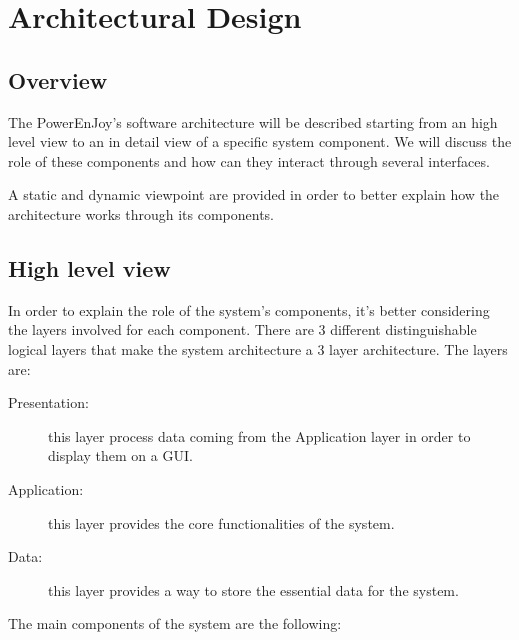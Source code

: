 \section{Architectural Design} \label{sec architectural design}

\subsection{Overview}

The PowerEnJoy's software architecture will be described starting from an high level view to an in detail view of a specific system component. We will discuss the role of these components and how can they interact through several interfaces.

A static and dynamic viewpoint are provided in order to better explain how the architecture works through its components.

\subsection{High level view}

In order to explain the role of the system's components, it's better considering the layers involved for each component.
There are 3 different distinguishable logical layers that make the system architecture a 3 layer architecture. The layers are:

\begin{description}
	\item[{\color{green} Presentation}:] this layer process data coming from the Application layer in order to display them on a GUI.
	\item[{\color{blue} Application}:] this layer provides the core functionalities of the system.
	\item[{\color{red} Data}:] this layer provides a way to store the essential data for the system.
\end{description}
The main components of the system are the following:

